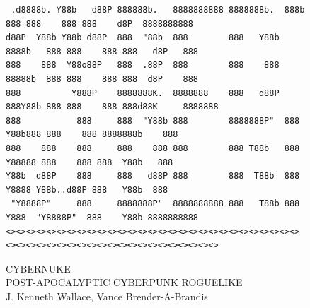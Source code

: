 \documentclass[10pt,conference,onecolumn,compsoc]{IEEEtran}
\begin{document}
\begin{figure}

\centering
\begin{footnotesize}
\begin{BVerbatim}
 .d8888b. Y88b   d88P 888888b.   8888888888 8888888b.  888b    888 888    888 888    d8P  8888888888 
d88P  Y88b Y88b d88P  888  "88b  888        888   Y88b 8888b   888 888    888 888   d8P   888        
888    888  Y88o88P   888  .88P  888        888    888 88888b  888 888    888 888  d8P    888        
888          Y888P    8888888K.  8888888    888   d88P 888Y88b 888 888    888 888d88K     8888888    
888           888     888  "Y88b 888        8888888P"  888 Y88b888 888    888 8888888b    888        
888    888    888     888    888 888        888 T88b   888  Y88888 888    888 888  Y88b   888        
Y88b  d88P    888     888   d88P 888        888  T88b  888   Y8888 Y88b..d88P 888   Y88b  888        
 "Y8888P"     888     8888888P"  8888888888 888   T88b 888    Y888  "Y8888P"  888    Y88b 8888888888 
<><><><><><><><><><><><><><><><><><><><><><><><><><><><><><><><><><><><><><><><><><><><><><><><><><>

\end{BVerbatim}
\end{footnotesize}

CYBERNUKE\\
{\small POST-APOCALYPTIC CYBERPUNK ROGUELIKE}\\
J. Kenneth Wallace, Vance Brender-A-Brandis\\
\end{figure}



\end{document}
